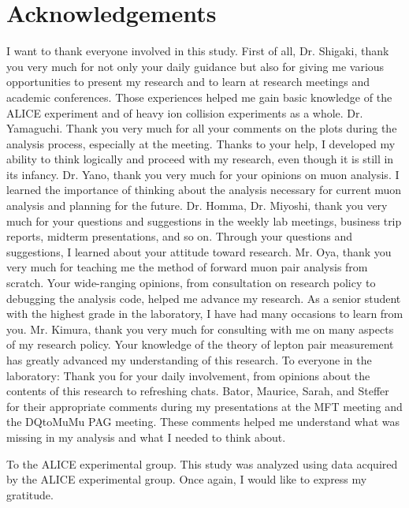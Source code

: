 \section{Acknowledgements}
I want to thank everyone involved in this study.
First of all, Dr. Shigaki, thank you very much for not only your daily guidance but also for giving me various opportunities to present my research and to learn at research meetings and academic conferences. Those experiences helped me gain basic knowledge of the ALICE experiment and of heavy ion collision experiments as a whole.
Dr. Yamaguchi. Thank you very much for all your comments on the plots during the analysis process, especially at the meeting. Thanks to your help, I developed my ability to think logically and proceed with my research, even though it is still in its infancy.
Dr. Yano, thank you very much for your opinions on muon analysis. I learned the importance of thinking about the analysis necessary for current muon analysis and planning for the future.
Dr. Homma, Dr. Miyoshi, thank you very much for your questions and suggestions in the weekly lab meetings, business trip reports, midterm presentations, and so on. Through your questions and suggestions, I learned about your attitude toward research.
Mr. Oya, thank you very much for teaching me the method of forward muon pair analysis from scratch. Your wide-ranging opinions, from consultation on research policy to debugging the analysis code, helped me advance my research. As a senior student with the highest grade in the laboratory, I have had many occasions to learn from you.
Mr. Kimura, thank you very much for consulting with me on many aspects of my research policy. Your knowledge of the theory of lepton pair measurement has greatly advanced my understanding of this research.
To everyone in the laboratory: Thank you for your daily involvement, from opinions about the contents of this research to refreshing chats.
Bator, Maurice, Sarah, and Steffer for their appropriate comments during my presentations at the MFT meeting and the DQtoMuMu PAG meeting. These comments helped me understand what was missing in my analysis and what I needed to think about.

To the ALICE experimental group.
This study was analyzed using data acquired by the ALICE experimental group. Once again, I would like to express my gratitude.